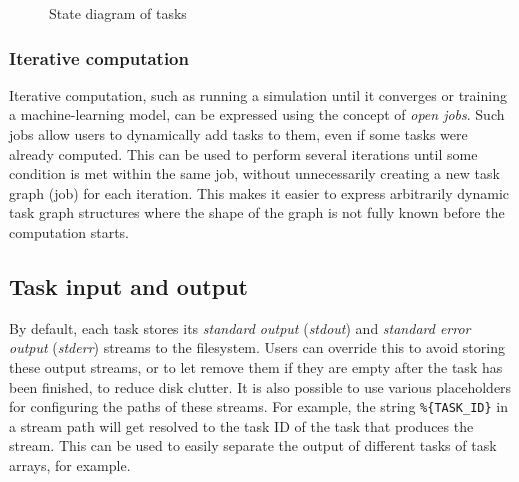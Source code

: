 \begin{figure}[h]
	\centering
	\caption{State diagram of \hyperqueue{} tasks}
	\label{fig:hq-task-state-diagram}
\end{figure}

\subsubsection*{Iterative computation}
Iterative computation, such as running a simulation until it converges or training a
machine-learning model, can be expressed using the concept of \emph{open jobs}. Such jobs
allow users to dynamically add tasks to them, even if some tasks were already computed. This can be
used to perform several iterations until some condition is met within the same job, without
unnecessarily creating a new task graph (job) for each iteration. This makes it easier to express
arbitrarily dynamic task graph structures where the shape of the graph is not fully known before
the computation starts.

\subsection{Task input and output}
\label{hq:task-input-and-output}
By default, each \hyperqueue{} task stores its \emph{standard output} (\emph{stdout}) and
\emph{standard error output} (\emph{stderr}) streams to the filesystem. Users can override this to avoid storing these
output streams, or to let \hq{} remove them if they are empty after the task has
been finished, to reduce disk clutter. It is also possible to use various placeholders for
configuring the paths of these streams. For example, the string \texttt{\%\{TASK\_ID\}} in a stream
path will get resolved to the task ID of the task that produces the stream. This can be used to
easily separate the output of different tasks of task arrays, for example.

